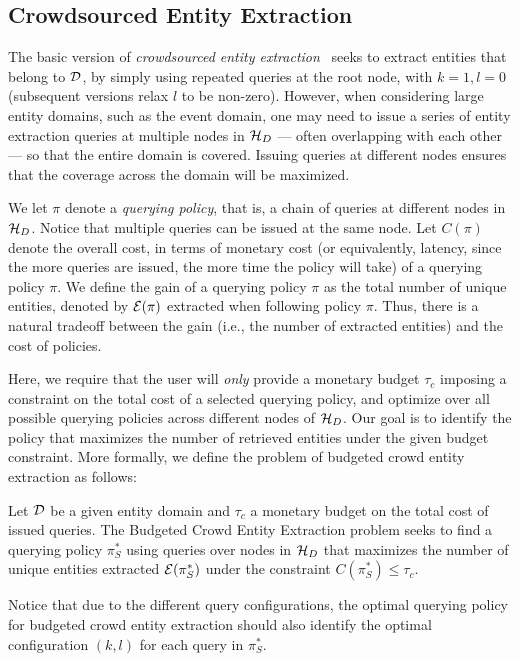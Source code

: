 \subsection{Crowdsourced Entity Extraction}
\label{sec:extraction}
The basic version of {\em crowdsourced entity extraction}~\cite{trushkowsky:2013} seeks to extract entities that belong to $\mathcal{D}$, by simply using repeated queries at the root node, with $k = 1, l = 0$ (subsequent versions relax $l$ to be non-zero). However, when considering large entity domains, such as the event domain, one may need to issue a series of entity extraction queries at multiple nodes in  $\mathcal{H}_D$ --- often overlapping with each other --- so that the entire domain is covered. Issuing queries at different nodes ensures that the coverage across the domain will be maximized. 

We let $\pi$ denote a {\em querying policy}, that is, a chain of queries at different nodes in $\mathcal{H}_D$. Notice that multiple queries can be issued at the same node. Let $C(\pi)$ denote the overall cost, in terms of monetary cost (or equivalently, latency, since the more queries are issued, the more time the policy will take) of a querying policy $\pi$. We define the gain of a querying policy $\pi$ as the total number of unique entities, denoted by $\mathcal{E}(\pi)$ extracted when following policy $\pi$. Thus, there is a natural tradeoff between the gain (i.e., the number of extracted entities) and the cost of policies. 

Here, we require that the user will {\em only} provide a monetary budget $\tau_c$ imposing a constraint on the total cost of a selected querying policy, and optimize over all possible querying policies across different nodes of $\mathcal{H}_D$. Our goal is to identify the policy that maximizes the number of retrieved entities under the given budget constraint. More formally, we define the problem of budgeted crowd entity extraction as follows:

\begin{problem}
Let $\mathcal{D}$ be a given entity domain and $\tau_c$ a monetary budget on the total cost of issued queries. The Budgeted Crowd Entity Extraction problem seeks to find a querying policy $\pi^*_S$ using queries over nodes in $\mathcal{H}_D$ that maximizes the number of unique entities extracted $\mathcal{E}(\pi^*_S)$ under the constraint $C(\pi^*_S) \leq \tau_c$.
\end{problem}
Notice that due to the different query configurations, the optimal querying policy for budgeted crowd entity extraction should also identify the optimal configuration $(k,l)$ for each query in $\pi^*_S$.

